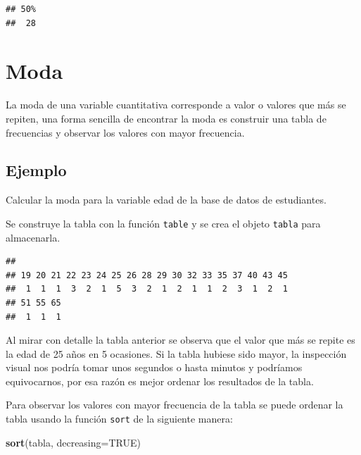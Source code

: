 \documentclass[10pt,]{krantz}
\makeatletter
\newenvironment{Shaded}{\begin{snugshade}}{\end{snugshade}}
\newcommand{\KeywordTok}[1]{\textcolor[rgb]{0.13,0.29,0.53}{\textbf{{#1}}}}
\newcommand{\DataTypeTok}[1]{\textcolor[rgb]{0.13,0.29,0.53}{{#1}}}
\newcommand{\StringTok}[1]{\textcolor[rgb]{0.31,0.60,0.02}{{#1}}}
\newcommand{\OtherTok}[1]{\textcolor[rgb]{0.56,0.35,0.01}{{#1}}}
\newcommand{\NormalTok}[1]{{#1}}
\newenvironment{kframe}{%
\medskip{}
\setlength{\fboxsep}{.8em}
 \def\at@end@of@kframe{}%
 \ifinner\ifhmode%
  \def\at@end@of@kframe{\end{minipage}}%
  \begin{minipage}{\columnwidth}%
 \fi\fi%
 \def\FrameCommand##1{\hskip\@totalleftmargin \hskip-\fboxsep
 \colorbox{shadecolor}{##1}\hskip-\fboxsep
     \hskip-\linewidth \hskip-\@totalleftmargin \hskip\columnwidth}%
 \MakeFramed {\advance\hsize-\width
   \@totalleftmargin\z@ \linewidth\hsize
   \@setminipage}}%
 {\par\unskip\endMakeFramed%
 \at@end@of@kframe}
\renewenvironment{Shaded}{\begin{kframe}}{\end{kframe}}
\makeatother
\begin{document}
\begin{verbatim}
## 50% 
##  28
\end{verbatim}

\section{\texorpdfstring{Moda }{Moda }}\label{moda}

La moda de una variable cuantitativa corresponde a valor o valores que
más se repiten, una forma sencilla de encontrar la moda es construir una
tabla de frecuencias y observar los valores con mayor frecuencia.

\subsection*{Ejemplo}\label{ejemplo-34}


Calcular la moda para la variable edad de la base de datos de
estudiantes.

Se construye la tabla con la función \texttt{table} y se crea el objeto
\texttt{tabla} para almacenarla.

\begin{Shaded}
\end{Shaded}

\begin{verbatim}
## 
## 19 20 21 22 23 24 25 26 28 29 30 32 33 35 37 40 43 45 
##  1  1  1  3  2  1  5  3  2  1  2  1  1  2  3  1  2  1 
## 51 55 65 
##  1  1  1
\end{verbatim}

Al mirar con detalle la tabla anterior se observa que el valor que más
se repite es la edad de 25 años en 5 ocasiones. Si la tabla hubiese sido
mayor, la inspección visual nos podría tomar unos segundos o hasta
minutos y podríamos equivocarnos, por esa razón es mejor ordenar los
resultados de la tabla.

Para observar los valores con mayor frecuencia de la tabla se puede
ordenar la tabla usando la función \texttt{sort} de la siguiente manera:

\begin{Shaded}
\begin{Highlighting}[]
\KeywordTok{sort}\NormalTok{(tabla, }\DataTypeTok{decreasing=}\OtherTok{TRUE}\NormalTok{)}
\end{Highlighting}
\end{Shaded}
\end{document}
